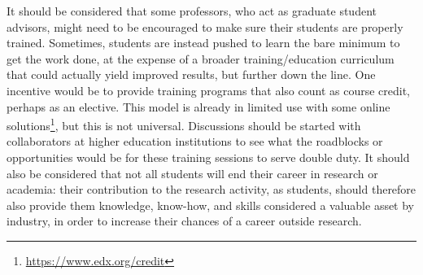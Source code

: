 It should be considered that some professors, who act as graduate student advisors, might need to be encouraged to make sure their students are properly trained. Sometimes, students are instead pushed to learn the bare minimum to get the work done, at the expense of a broader training/education curriculum that could actually yield improved results, but further down the line. One incentive would be to provide training programs that also count as course credit, perhaps as an elective. This model is already in limited use with some online solutions\footnote{\url{https://www.edx.org/credit}}, but this is not universal. Discussions should be started with collaborators at higher education institutions to see what the roadblocks or opportunities would be for these training sessions to serve double duty. 
It should also be considered that not all students will end their career in research or academia: their contribution to the research activity, as students, should therefore also provide them knowledge, know-how, and skills considered a valuable asset by industry, in order to increase their chances of a career outside research.

